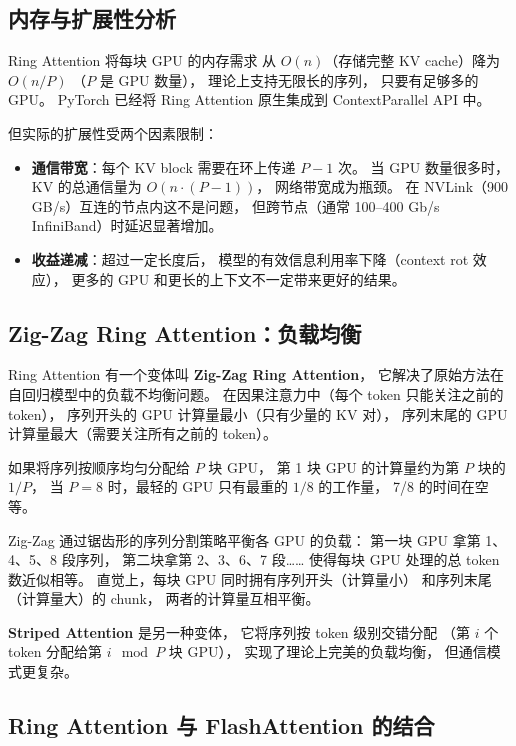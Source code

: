 \subsection{内存与扩展性分析}

Ring Attention 将每块 GPU 的内存需求
从 $O(n)$（存储完整 KV cache）降为 $O(n/P)$
（$P$ 是 GPU 数量），
理论上支持无限长的序列，
只要有足够多的 GPU。
PyTorch 已经将 Ring Attention 原生集成到
ContextParallel API 中。

但实际的扩展性受两个因素限制：
\begin{itemize}[noitemsep]
  \item \textbf{通信带宽}：每个 KV block 需要在环上传递 $P-1$ 次。
        当 GPU 数量很多时，KV 的总通信量为 $O(n \cdot (P-1))$，
        网络带宽成为瓶颈。
        在 NVLink（900 GB/s）互连的节点内这不是问题，
        但跨节点（通常 100--400 Gb/s InfiniBand）时延迟显著增加。
  \item \textbf{收益递减}：超过一定长度后，
        模型的有效信息利用率下降（context rot 效应），
        更多的 GPU 和更长的上下文不一定带来更好的结果。
\end{itemize}

\subsection{Zig-Zag Ring Attention：负载均衡}

Ring Attention 有一个变体叫 \textbf{Zig-Zag Ring Attention}，
它解决了原始方法在自回归模型中的负载不均衡问题。
在因果注意力中（每个 token 只能关注之前的 token），
序列开头的 GPU 计算量最小（只有少量的 KV 对），
序列末尾的 GPU 计算量最大（需要关注所有之前的 token）。

如果将序列按顺序均匀分配给 $P$ 块 GPU，
第 1 块 GPU 的计算量约为第 $P$ 块的 $1/P$，
当 $P = 8$ 时，最轻的 GPU 只有最重的 $1/8$ 的工作量，
7/8 的时间在空等。

Zig-Zag 通过锯齿形的序列分割策略平衡各 GPU 的负载：
第一块 GPU 拿第 1、4、5、8 段序列，
第二块拿第 2、3、6、7 段……
使得每块 GPU 处理的总 token 数近似相等。
直觉上，每块 GPU 同时拥有序列开头（计算量小）
和序列末尾（计算量大）的 chunk，
两者的计算量互相平衡。

\textbf{Striped Attention} 是另一种变体，
它将序列按 token 级别交错分配
（第 $i$ 个 token 分配给第 $i \mod P$ 块 GPU），
实现了理论上完美的负载均衡，
但通信模式更复杂。

\subsection{Ring Attention 与 FlashAttention 的结合}

